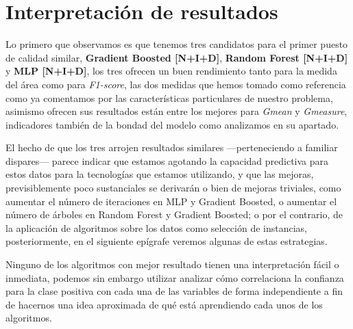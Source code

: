 \documentclass{article}
\newcommand{\img}[2]{
\noindent\makebox[\textwidth][c]{\texttt{[image: \#1]}}%
}
\begin{document}
\img{downres2}{1.2}

\section{Interpretación de resultados}

\img{Res1}{1.2}

Lo primero que observamos es que tenemos tres candidatos para el primer puesto de calidad similar, \textbf{Gradient Boosted [N+I+D]}, \textbf{Random Forest [N+I+D]} y \textbf{MLP [N+I+D]}, los tres ofrecen un buen rendimiento tanto para la medida del área como para \textit{F1-score}, las dos medidas que hemos tomado como referencia como ya comentamos por las características particulares de nuestro problema, asimismo ofrecen sus resultados están entre los mejores para \textit{Gmean} y \textit{Gmeasure}, indicadores también de la bondad del modelo como analizamos en su apartado. 

El hecho de que los tres arrojen resultados similares ---perteneciendo a familiar dispares--- parece indicar que estamos agotando la capacidad predictiva para estos datos para la tecnologías que estamos utilizando, y que las mejoras, previsiblemente poco sustanciales se derivarán o bien de mejoras triviales, como aumentar el número de iteraciones en MLP y Gradient Boosted, o aumentar el número de árboles en Random Forest y Gradient Boosted; o por el contrario, de la aplicación de algoritmos sobre los datos como selección de instancias, posteriormente, en el siguiente epígrafe veremos algunas de estas estrategias.

Ninguno de los algoritmos con mejor resultado tienen una interpretación fácil o inmediata, podemos sin embargo utilizar analizar cómo correlaciona la confianza para la clase positiva con cada una de las variables de forma independiente a fin de hacernos una idea aproximada de qué está aprendiendo cada unos de los algoritmos.

\img{results_analysis}{0.5}
\end{document}
